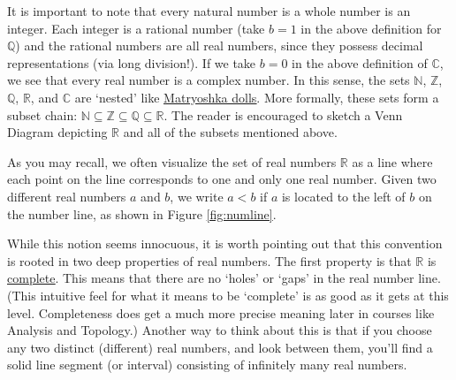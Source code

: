 \medskip


\medskip


It is important to note that every natural number is a whole number is an integer.   Each integer is a rational number (take $b =1$ in the above definition for $\mathbb Q$) and the rational numbers are all real numbers, since they possess decimal representations (via long division!). If we take $b=0$ in the above definition of $\mathbb C$, we see that every real number is a complex number.  In this sense, the sets $\mathbb N$, $\mathbb Z$, $\mathbb Q$, $\mathbb R$, and $\mathbb C$ are `nested' like \href{http://en.wikipedia.org/wiki/Matryoshka_doll}{\underline{Matryoshka dolls}}. More formally, these sets form a subset chain:  $\mathbb{N} \subseteq \mathbb Z \subseteq \mathbb{Q} \subseteq \mathbb{R}$.  The reader is encouraged to sketch a Venn Diagram depicting $\mathbb{R}$ and all of the subsets mentioned above.  

\medskip

As you may recall, we often visualize the set of real numbers $\mathbb{R}$ as a line where each point on the line corresponds to one and only one real number.  Given two different real numbers $a$ and $b$,  we write $a < b$ if $a$ is located to the left of $b$ on the number line, as shown in Figure \ref{fig:numline}.




While this notion seems innocuous, it is worth pointing out that this convention is rooted in two deep properties of real numbers.  The first property is that $\mathbb{R}$ is  \href{http://en.wikipedia.org/wiki/Complete_metric_space}{\underline{complete}}. This means that there are no `holes' or `gaps' in the real number line. (This intuitive feel for what it means to be `complete' is as good as it gets at this level.  Completeness does get a much more precise meaning later in courses like Analysis and Topology.) Another way to think about this is that if you choose any two distinct (different) real numbers, and look between them, you'll find a solid line segment (or interval) consisting of infinitely many real numbers.  



